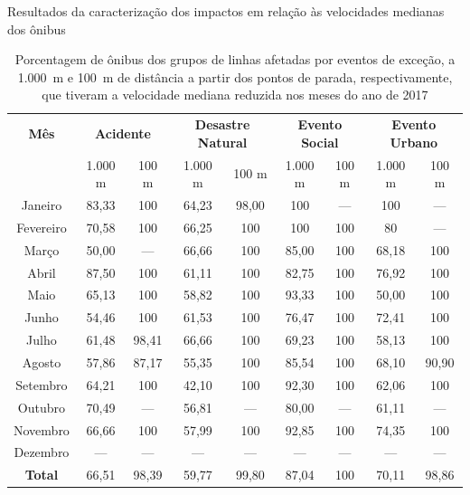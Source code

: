 \documentclass{beamer}
\begin{document}
\begin{frame}{Resultados da caracterização dos impactos em relação às velocidades medianas dos ônibus}
\begin{table}[!htb]
\centering
\caption {Porcentagem de ônibus dos grupos de linhas afetadas por eventos de exceção, a 1.000~m e 100~m de distância a partir dos pontos de parada, respectivamente, que tiveram a velocidade mediana reduzida nos meses do ano de 2017}
\label{tab:exceptEventVelocityImpAllStop}
\begin{adjustbox}{max height=10mm, width=3.5in}
\begin{tabular}{c|cc|cc|cc|cc}
\toprule
\textbf{Mês} & \multicolumn{2}{c}{\textbf{Acidente}} & \multicolumn{2}{c}{\textbf{Desastre Natural}} & \multicolumn{2}{c}{\textbf{Evento Social}} &
\multicolumn{2}{c}{\textbf{Evento Urbano}}\\
\cmidrule(l){2-3} \cmidrule(l){4-5} \cmidrule(l){6-7} \cmidrule(l){8-9}
 & 1.000 m & 100 m & 1.000 m & 100 m & 1.000 m & 100 m & 1.000 m & 100 m \\
\midrule
Janeiro & 83,33 &  100 & 
64,23 &  98,00 & 
100 & --- &
 100 & --- \\
\hline
Fevereiro & 70,58 &  100 &
 66,25 &  100 &
 100 & 100 &
 80 & --- \\
\hline
Março &  50,00 &  --- & 
66,66 &  100 &
85,00 & 100 &
68,18 & 100 \\
\hline
Abril & 87,50 &100 & 
 61,11 & 100 & 
 82,75 & 100 & 
 76,92 &  100 \\
\hline
Maio & 65,13 &  100 &
 58,82 &  100 &
 93,33 & 100 &
 50,00 & 100 \\
\hline
Junho & 54,46 &  100 &
 61,53 &  100 &
 76,47 & 100 &
 72,41 & 100 \\
\hline
Julho & 61,48 &  98,41 &
 66,66 & 100 &
 69,23 & 100 &
58,13 & 100 \\
\hline
Agosto & 57,86 & 87,17 &
 55,35 & 100 &
 85,54 & 100 & 
 68,10 & 90,90 \\
\hline
Setembro & 64,21 & 100 &
 42,10 & 100 &
 92,30 & 100 & 
 62,06 & 100 \\
\hline
Outubro & 70,49 & --- &
 56,81 & --- &
 80,00 & --- &
 61,11 & --- \\
\hline
Novembro & 66,66 & 100 &
 57,99 & 100 &
 92,85 & 100 &
 74,35 & 100 \\
\hline
Dezembro & --- & --- & --- & --- & --- & --- & --- & ---  \\
\midrule
\midrule
\textbf{\alert{Total}} & \alert{66,51} & \alert{98,39} & \alert{59,77} & \alert{99,80} & \alert{87,04} & \alert{100} & \alert{70,11} & \alert{98,86}  \\
\bottomrule
\end{tabular}
\end{adjustbox}
\end{table}
\end{frame}
\end{document}
